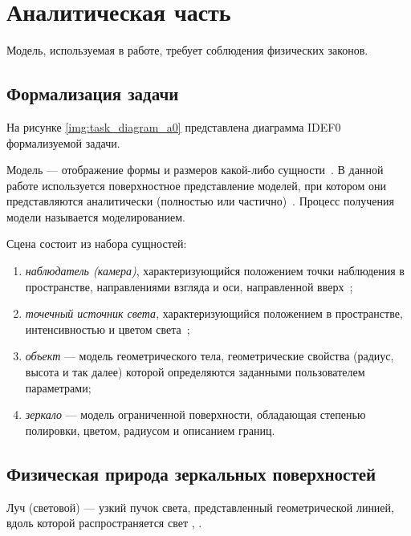 \chapter{Аналитическая часть}

Модель, используемая в работе, требует соблюдения физических законов.

\section{Формализация задачи}

На рисунке \ref{img:task_diagram_a0} представлена диаграмма IDEF0 формализуемой задачи.


Модель --- отображение формы и размеров какой-либо сущности~\cite{куров}.
В данной работе используется поверхностное представление моделей, при котором они представляются аналитически (полностью или частично)~\cite{куров}.
Процесс получения модели называется моделированием.


Сцена состоит из набора сущностей:
\begin{enumerate}
	\item \textit{наблюдатель (камера)}, характеризующийся положением точки наблюдения в пространстве, направлениями взгляда и оси, направленной вверх~\cite{куров};
	\item \textit{точечный источник света}, характеризующийся положением в пространстве, интенсивностью и цветом света~\cite{куров};
	\item \textit{объект} --- модель геометрического тела, геометрические свойства (радиус, высота и так далее) которой определяются заданными пользователем параметрами;
	\item \textit{зеркало} --- модель ограниченной поверхности, обладающая степенью полировки, цветом, радиусом и описанием границ.
\end{enumerate}

\section{Физическая природа зеркальных поверхностей}

Луч (световой) --- узкий пучок света, представленный геометрической линией, вдоль которой распространяется свет \cite{тюрин2005физика}, \cite{оптика20036}. 

